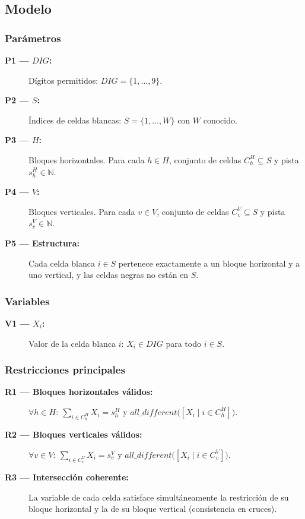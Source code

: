
\subsection{Modelo}\label{sec:02-kakuro-modelo}

\subsubsection*{Parámetros}
\begin{description}
  \item[\textbf{P1 — \(DIG\):}] Dígitos permitidos: \(DIG=\{1,\dots,9\}\).
  \item[\textbf{P2 — \(S\):}] Índices de celdas blancas: \(S=\{1,\dots,W\}\) con \(W\) conocido.
  \item[\textbf{P3 — \(H\):}] Bloques horizontales. Para cada \(h\in H\), conjunto de celdas \(C^H_h\subseteq S\) y pista \(s^H_h\in\mathbb{N}\).
  \item[\textbf{P4 — \(V\):}] Bloques verticales. Para cada \(v\in V\), conjunto de celdas \(C^V_v\subseteq S\) y pista \(s^V_v\in\mathbb{N}\).
  \item[\textbf{P5 — Estructura:}] Cada celda blanca \(i\in S\) pertenece exactamente a un bloque horizontal y a uno vertical, y las celdas negras no están en \(S\).
\end{description}

\subsubsection*{Variables}
\begin{description}
  \item[\textbf{V1 — \(X_i\):}] Valor de la celda blanca \(i\): \(X_i\in DIG\) para todo \(i\in S\).
\end{description}

\subsubsection*{Restricciones principales}
\begin{description}
  \item[\textbf{R1 — Bloques horizontales válidos:}] \(\forall h\in H:\ \sum_{i\in C^H_h} X_i = s^H_h\) y \(\textit{all\_different}\big([X_i\mid i\in C^H_h]\big)\).
  \item[\textbf{R2 — Bloques verticales válidos:}] \(\forall v\in V:\ \sum_{i\in C^V_v} X_i = s^V_v\) y \(\textit{all\_different}\big([X_i\mid i\in C^V_v]\big)\).
  \item[\textbf{R3 — Intersección coherente:}] La variable de cada celda satisface simultáneamente la restricción de su bloque horizontal y la de su bloque vertical (consistencia en cruces).
\end{description}

